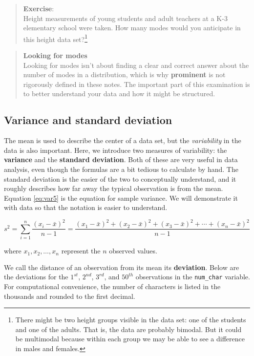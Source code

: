 \documentclass[
]{book}
\begin{document}
\begin{quote}
\textbf{Exercise}:\\
Height measurements of young students and adult teachers at a K-3 elementary school were taken. How many modes would you anticipate in this height data set?\footnote{There might be two height groups visible in the data set: one of the students and one of the adults. That is, the data are probably bimodal. But it could be multimodal because within each group we may be able to see a difference in males and females.}
\end{quote}

\begin{quote}
\textbf{Looking for modes}\\
Looking for modes isn't about finding a clear and correct answer about the number of modes in a distribution, which is why \textbf{prominent} is not rigorously defined in these notes. The important part of this examination is to better understand your data and how it might be structured.
\end{quote}

\hypertarget{variance-and-standard-deviation}{%
\subsection{Variance and standard deviation}\label{variance-and-standard-deviation}}

The mean is used to describe the center of a data set, but the \emph{variability} in the data is also important. Here, we introduce two measures of variability: the \textbf{variance} and the \textbf{standard deviation}. Both of these are very useful in data analysis, even though the formulas are a bit tedious to calculate by hand. The standard deviation is the easier of the two to conceptually understand, and it roughly describes how far away the typical observation is from the mean. Equation \eqref{eq:var5} is the equation for sample variance. We will demonstrate it with data so that the notation is easier to understand.

\begin{equation} 
  s^2 = \sum_{i=1}^{n}\frac{(x_i-\bar{x})^2}{n-1}=\frac{(x_1-\bar{x})^2 + (x_2-\bar{x})^2 + (x_3-\bar{x})^2 + \cdots + (x_n-\bar{x})^2}{n-1}
  \label{eq:var5}
\end{equation}

where \(x_1, x_2, \dots, x_n\) represent the \(n\) observed values.

We call the distance of an observation from its mean its \textbf{deviation}. Below are the deviations for the \(1^{st}\), \(2^{nd}\), \(3^{rd}\), and \(50^{th}\) observations in the \texttt{num\_char} variable. For computational convenience, the number of characters is listed in the thousands and rounded to the first decimal.
\end{document}
